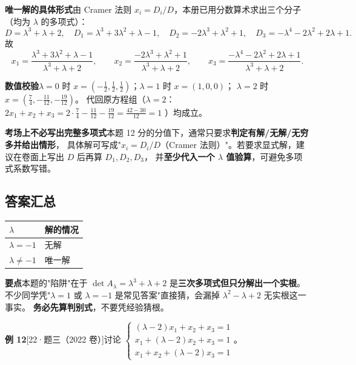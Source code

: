 \documentclass[10pt]{ctexart}
\newcommand{\yii}[1]{\textcolor{y22}{[22·#1]}}
\begin{document}
\textbf{唯一解的具体形式}\quad 由 Cramer 法则 $x_i=D_i/D$，本册已用分数算术求出三个分子（均为 $\lambda$ 的多项式）：
\[
D=\lambda^3+\lambda+2,\quad
D_1=\lambda^3+3\lambda^2+\lambda-1,\quad
D_2=-2\lambda^3+\lambda^2+1,\quad
D_3=-\lambda^4-2\lambda^2+2\lambda+1 .
\]
故
\[
x_1=\frac{\lambda^3+3\lambda^2+\lambda-1}{\lambda^3+\lambda+2},\qquad
x_2=\frac{-2\lambda^3+\lambda^2+1}{\lambda^3+\lambda+2},\qquad
x_3=\frac{-\lambda^4-2\lambda^2+2\lambda+1}{\lambda^3+\lambda+2}.
\]

\textbf{数值校验}\quad $\lambda=0$ 时 $x=(-\tfrac12,\tfrac12,\tfrac12)$；$\lambda=1$ 时 $x=(1,0,0)$；
$\lambda=2$ 时 $x=(\tfrac74,-\tfrac{11}{12},-\tfrac{19}{12})$。
代回原方程组（$\lambda=2$：$2x_1+x_2+x_3=2\cdot\tfrac74-\tfrac{11}{12}-\tfrac{19}{12}=\tfrac{42-30}{12}=1$ \checkmark）均成立。

\begin{warnbox}
\textbf{考场上不必写出完整多项式}\quad 本题 12 分的分值下，通常只要求\textbf{判定有解/无解/无穷多并给出情形}，
具体解可写成"$x_i=D_i/D$（Cramer 法则）"。若要求显式解，建议在卷面上写出 $D$ 后再算 $D_1,D_2,D_3$，
并\textbf{至少代入一个 $\lambda$ 值验算}，可避免多项式系数写错。
\end{warnbox}

\subsection*{答案汇总}
\begin{center}
\begin{tabular}{@{}ll@{}}
\toprule
$\lambda$ & 解的情况\\
\midrule
$\lambda=-1$ & 无解\\
$\lambda\ne-1$ & 唯一解\\
\bottomrule
\end{tabular}
\end{center}

\begin{tipbox}
\textbf{要点}\quad 本题的"陷阱"在于 $\det A_\lambda=\lambda^3+\lambda+2$ 是\textbf{三次多项式但只分解出一个实根}。
不少同学凭"$\lambda=1$ 或 $\lambda=-1$ 是常见答案"直接猜，会漏掉 $\lambda^2-\lambda+2$ 无实根这一事实。
\textbf{务必先算判别式}，不要凭经验猜根。
\end{tipbox}

\medskip
\textbf{例 12}\yii{题三（2022 卷）}\quad 讨论
$\begin{cases}(\lambda-2)x_1+x_2+x_3=1\\ x_1+(\lambda-2)x_2+x_3=1\\ x_1+x_2+(\lambda-2)x_3=1\end{cases}$。
\end{document}
